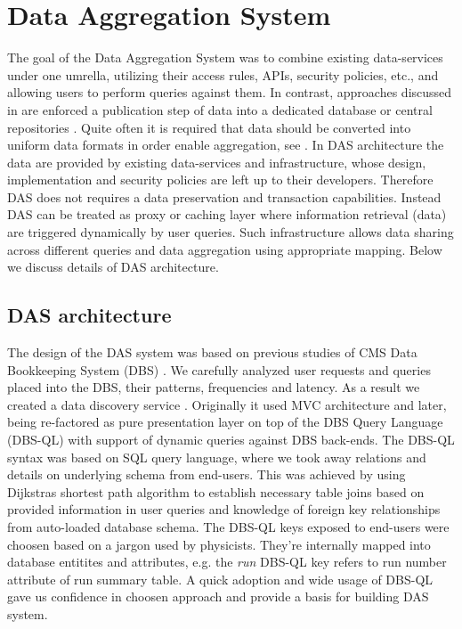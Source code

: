 \documentclass[a4paper]{jpconf}
\begin{document}
\section{Data Aggregation System\label{DAS}}
The goal of the Data Aggregation System was to combine existing data-services
under one umrella, utilizing their access rules, APIs, security policies, etc., and
allowing users to perform queries against them. In contrast, approaches
discussed in \cite{DBXplorer, QueryAnswer, FedDB} are
enforced a publication step of data into a dedicated database 
or central repositories \cite{iRODS}. Quite often it is required
that data should be converted into uniform data formats in order enable
aggregation, see \cite{OpenArchive}. In DAS architecture the data are provided
by existing data-services and infrastructure, whose design, implementation and
security policies are left up to their developers. Therefore DAS does not requires
a data preservation and transaction capabilities. Instead DAS can be treated
as proxy or caching layer where information retrieval (data) are triggered dynamically
by user queries. Such infrastructure allows data sharing across different queries and
data aggregation using appropriate mapping. Below we discuss details of
DAS architecture.

\subsection{DAS architecture}
The design of the DAS system was based on previous studies of CMS Data 
Bookkeeping System (DBS) \cite{DBS, DBS07}. We carefully analyzed user
requests and queries placed into the DBS, their patterns, frequencies and latency. 
As a result we created a data discovery service \cite{DD}. Originally it used MVC
architecture and later, being re-factored as pure presentation layer on top of 
the DBS Query Language (DBS-QL) \cite{DBS-QL} with support of dynamic queries against
DBS back-ends. The DBS-QL \cite{DBS-QL} syntax was based on SQL query language, where 
we took away relations and details on underlying schema from end-users. 
This was achieved by using Dijkstras shortest path algorithm 
to establish necessary table joins based on provided information in user queries and
knowledge of foreign key relationships from auto-loaded database schema.
The DBS-QL keys exposed to end-users were choosen based on a jargon used by
physicists. They're internally mapped into database entitites and attributes, 
e.g. the {\it run} DBS-QL key refers to run number attribute of run summary table.
A quick adoption and wide usage of DBS-QL gave us confidence in choosen approach 
and provide a basis for building DAS system.
\end{document}
